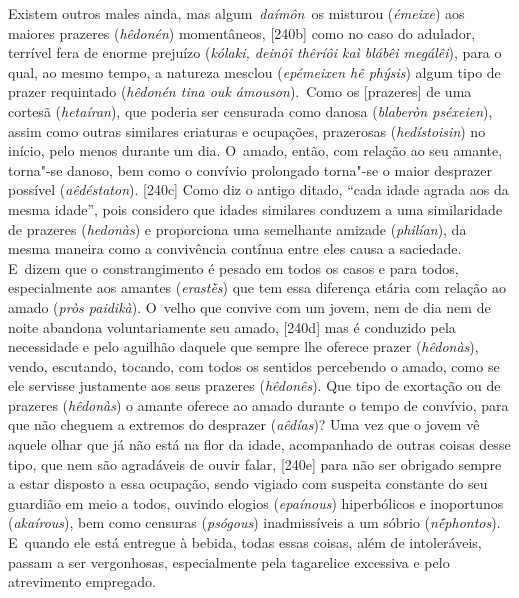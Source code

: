  

 Existem outros males ainda, mas algum~\emph{daímôn}~os misturou
(\emph{émeixe}) aos maiores prazeres (\emph{hêdonén}) momentâneos,
[240b] como no caso do adulador, terrível fera de enorme prejuízo
(\emph{kólaki, deinôi thêríôi kaì blábêi megálêi}), para o qual, ao
mesmo tempo, a natureza mesclou (\emph{epémeixen hê phýsis}) algum tipo
de prazer requintado (\emph{hêdonén tina ouk ámouson}).~Como os
[prazeres] de uma cortesã (\emph{hetaíran}), que poderia ser
censurada como danosa (\emph{blaberòn pséxeien}), assim como outras
similares criaturas e ocupações, prazerosas (\emph{hedístoisin}) no
início, pelo menos durante um dia. O~amado, então, com relação ao seu
amante, torna"-se danoso, bem como o convívio prolongado torna"-se o maior
desprazer possível (\emph{aêdéstaton}). [240c] Como diz o antigo
ditado, ``cada idade agrada aos da mesma idade'', pois considero que
idades similares conduzem a uma similaridade de prazeres
(\emph{hedonàs}) e proporciona uma semelhante amizade (\emph{philían}),
da mesma maneira como a convivência contínua entre eles causa a
saciedade. E~dizem que o constrangimento é pesado em todos os casos e
para todos, especialmente aos amantes (\emph{erastḕs}) que tem essa
diferença etária com relação ao amado (\emph{pròs paidikà}). O~velho que
convive com um jovem, nem de dia nem de noite abandona voluntariamente
seu amado, [240d] mas é conduzido pela necessidade e pelo aguilhão
daquele que sempre lhe oferece prazer (\emph{hêdonàs}), vendo,
escutando, tocando, com todos os sentidos percebendo o amado, como se
ele servisse justamente aos seus prazeres (\emph{hêdonês}). Que tipo de
exortação ou de prazeres (\emph{hêdonàs}) o amante oferece ao amado
durante o tempo de convívio, para que não cheguem a extremos do
desprazer (\emph{aêdías})? Uma vez que o jovem vê aquele olhar que já
não está na flor da idade, acompanhado de outras coisas desse tipo, que
nem são agradáveis de ouvir falar, [240e] para não ser obrigado
sempre a estar disposto a essa ocupação, sendo vigiado com suspeita
constante do seu guardião em meio a todos, ouvindo elogios
(\emph{epaínous}) hiperbólicos e inoportunos (\emph{akaírous}), bem como
censuras (\emph{psógous}) inadmissíveis a um sóbrio (\emph{nḗphontos}).
E~quando ele está entregue à bebida, todas essas coisas, além de
intoleráveis, passam a ser vergonhosas, especialmente pela tagarelice
excessiva e pelo atrevimento empregado.

